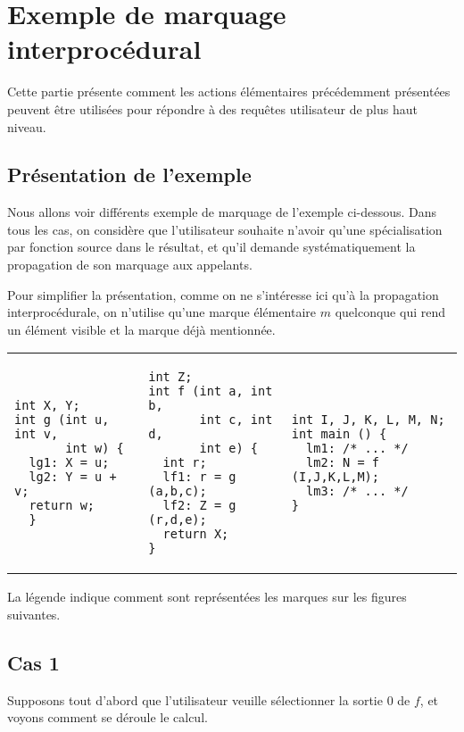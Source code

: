 
\chapter{Exemple de marquage interprocédural}

Cette partie présente comment les actions élémentaires précédemment présentées
peuvent être utilisées pour répondre à des requêtes utilisateur de plus haut
niveau.


\section{Présentation de l'exemple}

Nous allons voir différents exemple de marquage de l'exemple ci-dessous.
Dans tous les cas, on considère que l'utilisateur souhaite n'avoir qu'une
spécialisation par fonction source dans le résultat, et qu'il demande
systématiquement la propagation de son marquage aux appelants.
\bb

Pour simplifier la présentation,
comme on ne s'intéresse ici qu'à la propagation interprocédurale,
on n'utilise qu'une marque élémentaire $m$ quelconque qui rend un élément
visible et la marque \spare{} déjà mentionnée.

\noindent\begin{tabular}{p{4.4cm}p{4.5cm}p{5.3cm}}
\begin{verbatim}
int X, Y;
int g (int u, int v,
       int w) {
  lg1: X = u;
  lg2: Y = u + v;
  return w;
  }
\end{verbatim}
&
\begin{verbatim}
int Z;
int f (int a, int b,
       int c, int d,
       int e) {
  int r;
  lf1: r = g (a,b,c);
  lf2: Z = g (r,d,e);
  return X;
}
\end{verbatim}
&
\begin{verbatim}
int I, J, K, L, M, N;
int main () {
  lm1: /* ... */
  lm2: N = f (I,J,K,L,M);
  lm3: /* ... */
}
\end{verbatim}
\end{tabular}

\bb\centerline{}\bb

La légende indique comment sont représentées les marques sur les figures
suivantes.

\section{Cas 1}

Supposons tout d'abord que l'utilisateur veuille sélectionner la sortie 0
de $f$, et voyons comment se déroule le calcul.\bb

